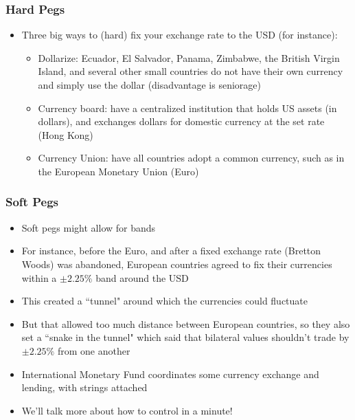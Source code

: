 \documentclass{beamer}
\begin{document}
\begin{frame}
\frametitle[alignment=center]{Hard Pegs}
\begin{itemize}
\item Three big ways to (hard) fix your exchange rate to the USD (for instance):
\bigskip
\begin{itemize}
\item Dollarize:  Ecuador, El Salvador, Panama, Zimbabwe, the British Virgin Island, and several other small countries do not have their own currency and simply use the dollar (disadvantage is seniorage)
\bigskip
\item Currency board:  have a centralized institution that holds US assets (in dollars), and exchanges dollars for domestic currency at the set rate (Hong Kong)
\bigskip
\item Currency Union:  have all countries adopt a common currency, such as in the European Monetary Union (Euro)
\end{itemize}
\end{itemize}
\end{frame}

\begin{frame}
\frametitle[alignment=center]{Soft Pegs}
\begin{itemize}
\item Soft pegs might allow for bands
\bigskip
\item For instance, before the Euro, and after a fixed exchange rate (Bretton Woods) was abandoned, European countries agreed to fix their currencies within a $\pm2.25\%$ band around the USD
\bigskip
\item This created a ``tunnel" around which the currencies could fluctuate
\bigskip
\item But that allowed too much distance between European countries, so they also set a ``snake in the tunnel" which said that bilateral values shouldn't trade by $\pm2.25\%$ from one another
\bigskip
\item International Monetary Fund coordinates some currency exchange and lending, with strings attached
\bigskip
\item We'll talk more about how to control in a minute!
\end{itemize}
\end{frame}
\end{document}
